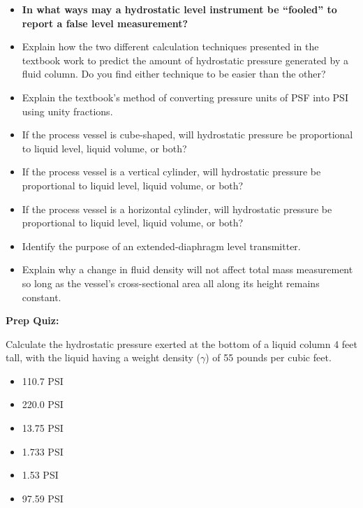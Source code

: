 \begin{itemize}
\item{} {\bf In what ways may a hydrostatic level instrument be ``fooled'' to report a false level measurement?}
\item{} Explain how the two different calculation techniques presented in the textbook work to predict the amount of hydrostatic pressure generated by a fluid column.  Do you find either technique to be easier than the other?
\item{} Explain the textbook's method of converting pressure units of PSF into PSI using unity fractions.
\item{} If the process vessel is cube-shaped, will hydrostatic pressure be proportional to liquid level, liquid volume, or both?
\item{} If the process vessel is a vertical cylinder, will hydrostatic pressure be proportional to liquid level, liquid volume, or both?
\item{} If the process vessel is a horizontal cylinder, will hydrostatic pressure be proportional to liquid level, liquid volume, or both?
\item{} Identify the purpose of an extended-diaphragm level transmitter.
\item{} Explain why a change in fluid density will not affect total mass measurement so long as the vessel's cross-sectional area all along its height remains constant.
\end{itemize}







\vfil \eject

\noindent
{\bf Prep Quiz:}

Calculate the hydrostatic pressure exerted at the bottom of a liquid column 4 feet tall, with the liquid having a weight density ($\gamma$) of 55 pounds per cubic feet.

\begin{itemize}
\item{} 110.7 PSI
\vskip 5pt 
\item{} 220.0 PSI
\vskip 5pt 
\item{} 13.75 PSI
\vskip 5pt 
\item{} 1.733 PSI
\vskip 5pt 
\item{} 1.53 PSI
\vskip 5pt 
\item{} 97.59 PSI
\end{itemize}














